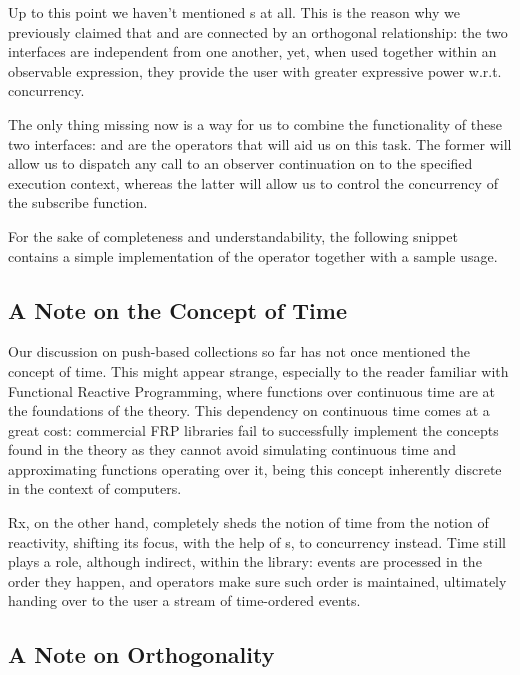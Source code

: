 Up to this point we haven't mentioned s at all. This is the reason why we previously claimed that  and  are connected by an orthogonal relationship: the two interfaces are independent from one another, yet, when used together within an observable expression, they provide the user with greater expressive power w.r.t. concurrency. 

The only thing missing now is a way for us to combine the functionality of these two interfaces:  and  are the operators that will aid us on this task. The former will allow us to dispatch any call to an observer continuation on to the specified execution context, whereas the latter will allow us to control the concurrency of the  subscribe function.

For the sake of completeness and understandability, the following snippet contains a simple implementation of the  operator together with a sample usage.



\subsection{A Note on the Concept of Time}

Our discussion on push-based collections so far has not once mentioned the concept of time. This might appear strange, especially to the reader familiar with Functional Reactive Programming, where functions over continuous time are at the foundations of the theory. This dependency on continuous time comes at a great cost: commercial FRP libraries fail to successfully implement the concepts found in the theory\cite{elliott2014denotational} as they cannot avoid simulating continuous time and approximating functions operating over it, being this concept inherently discrete in the context of computers.

Rx, on the other hand, completely sheds the notion of time from the notion of reactivity\cite{meijer2010observable}, shifting its focus, with the help of s, to concurrency instead. Time still plays a role, although indirect, within the library: events are processed in the order they happen, and operators make sure such order is maintained, ultimately handing over to the user a stream of time-ordered events.

\subsection{A Note on Orthogonality}

